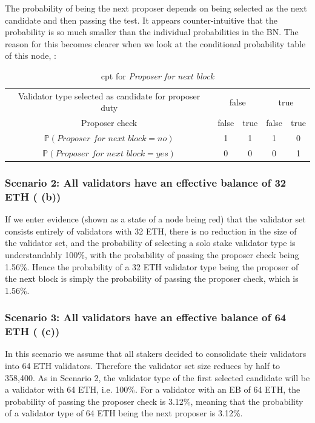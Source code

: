 \documentclass[submission,copyright,creativecommons]{eptcs}
\newcommand{\prob}{\mathbb P}
\begin{document}
The probability of being the next proposer depends on being selected as the next candidate and then passing the test. It appears counter-intuitive that the probability is so much smaller than the individual probabilities in the BN. The reason for this becomes clearer when we look at the conditional probability table of this node, :

\begin{table}[htp]
\caption{\gls{cpt} for \textit{Proposer for next block}}
\begin{center}
\begin{tabular}{c|c|c|c|c}
  \hline
  Validator type selected as candidate for proposer duty & \multicolumn{2}{|c}{false} & \multicolumn{2}{|c}{true} \\
  \cline{2-5}
  Proposer check    & false & true & false & true \\
  \hline
  $\prob(\textit{Proposer for next block} = no) $    & 1 & 1 & 1 & 0 \\
   $\prob(\textit{Proposer for next block} = yes)$   & 0 & 0 & 0 & 1 \\
  \hline
\end{tabular}
\end{center}
\label{tbl:cpt}
\end{table}

\subsubsection*{Scenario 2: All validators have an effective balance of 32 ETH  ( (b))}
If we enter evidence (shown as a state of a node being red) that the validator set consists entirely of validators with 32 ETH, there is no reduction in the size of the validator set, and the probability of selecting a solo stake validator type is understandably 100\%, with the probability of passing the proposer check being 1.56\%. Hence the probability of a 32 ETH validator type being the proposer of the next block is simply the probability of passing the proposer check, which is 1.56\%.

\subsubsection*{Scenario 3: All validators have an effective balance of 64 ETH ( (c))}
In this scenario we assume that all stakers decided to consolidate their validators into 64 ETH validators. Therefore the validator set size reduces by half to 358,400. As in Scenario 2, the validator type of the first selected candidate will be a validator with 64 ETH, i.e. 100\%. For a validator with an EB of 64 ETH, the probability of passing the proposer check is 3.12\%, meaning that the probability of a validator type of 64 ETH being the next proposer is 3.12\%.
\end{document}
